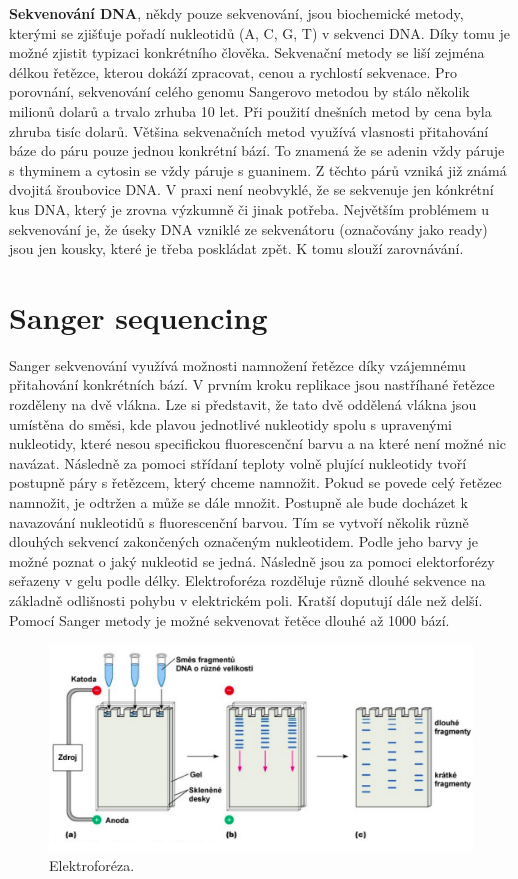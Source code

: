 \documentclass[czech,DP]{thesiskiv}
\numberwithin{equation}{section}
\begin{document}
\noindent
\textbf{Sekvenování DNA}, někdy pouze sekvenování, jsou biochemické metody, kterými se zjišťuje pořadí nukleotidů (A, C, G, T) v sekvenci DNA. Díky tomu je možné zjistit typizaci konkrétního člověka. Sekvenační metody se liší zejména délkou řetězce, kterou dokáží zpracovat, cenou a rychlostí sekvenace. Pro porovnání, sekvenování celého genomu Sangerovo metodou by stálo několik milionů dolarů a trvalo zrhuba 10 let. Při použití dnešních metod by cena byla zhruba tisíc dolarů. Většina sekvenačních metod využívá vlasnosti přitahování báze do páru pouze jednou konkrétní bází. To znamená že se adenin vždy páruje s thyminem a cytosin se vždy páruje s guaninem. Z těchto párů vzniká již známá dvojitá šroubovice DNA. V praxi není neobvyklé, že se sekvenuje jen kónkrétní kus DNA, který je zrovna výzkumně či jinak potřeba. Největším problémem u sekvenování je, že úseky DNA vzniklé ze sekvenátoru (označovány jako ready) jsou jen kousky, které je třeba poskládat zpět. K tomu slouží zarovnávání. \cite{sekvenovani_ziva} 


\section{Sanger sequencing}
Sanger sekvenování využívá možnosti namnožení řetězce díky vzájemnému přitahování konkrétních bází. V prvním kroku replikace jsou nastříhané řetězce rozděleny na dvě vlákna. Lze si představit, že tato dvě oddělená vlákna jsou umístěna do směsi, kde plavou jednotlivé nukleotidy spolu s upravenými nukleotidy, které nesou specifickou fluorescenční barvu a na které není možné nic navázat. Následně za pomoci střídaní teploty volně plující nukleotidy tvoří postupně páry s řetězcem, který chceme namnožit. Pokud se povede celý řetězec namnožit, je odtržen a může se dále množit. Postupně ale bude docházet k navazování nukleotidů s fluorescenční barvou. Tím se vytvoří několik různě dlouhých sekvencí zakončených označeným nukleotidem. Podle jeho barvy je možné poznat o jaký nukleotid se jedná. Následně jsou za pomoci elektorforézy seřazeny v gelu podle délky. Elektroforéza rozděluje různě dlouhé sekvence na základně odlišnosti pohybu v elektrickém poli. Kratší doputují dále než delší. Pomocí Sanger metody je možné sekvenovat řetěce dlouhé až 1000 bází.   

\begin{figure}[H]		
		\centering
		\includegraphics[width=\textwidth]{./img/elektroforeza.png}
		\caption{Elektroforéza. \cite{elektroforeza_img}}
		\label{fig:elektroforeza}
\end{figure}
 
\end{document}
